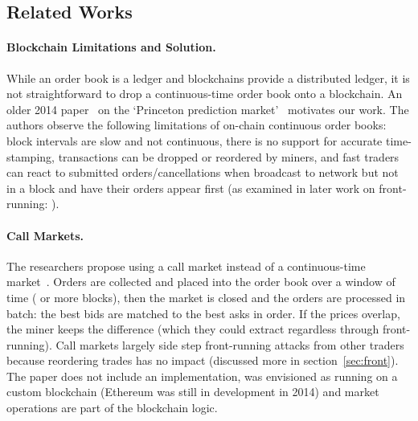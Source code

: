 \subsection{Related Works}

\paragraph{Blockchain Limitations and Solution.} While an order book is a ledger and blockchains provide a distributed ledger, it is not straightforward to drop a continuous-time order book onto a blockchain. An older 2014 paper~\cite{clark2014decentralizing} on the `Princeton prediction market'~\cite{Bra13} motivates our work. The authors observe the following limitations of on-chain continuous order books: block intervals are slow and not continuous, there is no support for accurate time-stamping, transactions can be dropped or reordered by miners, and fast traders can react to submitted orders/cancellations when broadcast to network but not in a block and have their orders appear first (as examined in later work on front-running: \cite{eskandari2019sok,daian2019flash}).

\paragraph{Call Markets.} The researchers propose using a call market instead of a continuous-time market~\cite{clark2014decentralizing}. Orders are collected and placed into the order book over a window of time ( or more blocks), then the market is closed and the orders are processed in batch: the best bids are matched to the best asks in order. If the prices overlap, the miner keeps the difference (which they could extract regardless through front-running). Call markets largely side step front-running attacks from other traders because reordering trades has no impact (discussed more in section~\ref{sec:front}). The paper does not include an implementation, was envisioned as running on a custom blockchain (Ethereum was still in development in 2014) and market operations are part of the blockchain logic.

